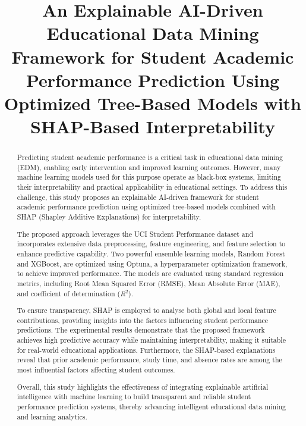 \documentclass[conference]{IEEEtran}
\begin{document}
\title{An Explainable AI-Driven Educational Data Mining Framework for Student Academic Performance Prediction Using Optimized Tree-Based Models with SHAP-Based Interpretability}

\author{
}

\maketitle

\begin{abstract}
Predicting student academic performance is a critical task in educational data mining (EDM), enabling early intervention and improved learning outcomes. However, many machine learning models used for this purpose operate as black-box systems, limiting their interpretability and practical applicability in educational settings. To address this challenge, this study proposes an explainable AI-driven framework for student academic performance prediction using optimized tree-based models combined with SHAP (Shapley Additive Explanations) for interpretability. 

The proposed approach leverages the UCI Student Performance dataset and incorporates extensive data preprocessing, feature engineering, and feature selection to enhance predictive capability. Two powerful ensemble learning models, Random Forest and XGBoost, are optimized using Optuna, a hyperparameter optimization framework, to achieve improved performance. The models are evaluated using standard regression metrics, including Root Mean Squared Error (RMSE), Mean Absolute Error (MAE), and coefficient of determination ($R^2$). 

To ensure transparency, SHAP is employed to analyse both global and local feature contributions, providing insights into the factors influencing student performance predictions. The experimental results demonstrate that the proposed framework achieves high predictive accuracy while maintaining interpretability, making it suitable for real-world educational applications. Furthermore, the SHAP-based explanations reveal that prior academic performance, study time, and absence rates are among the most influential factors affecting student outcomes. 

Overall, this study highlights the effectiveness of integrating explainable artificial intelligence with machine learning to build transparent and reliable student performance prediction systems, thereby advancing intelligent educational data mining and learning analytics. 
\end{abstract}
\end{document}
